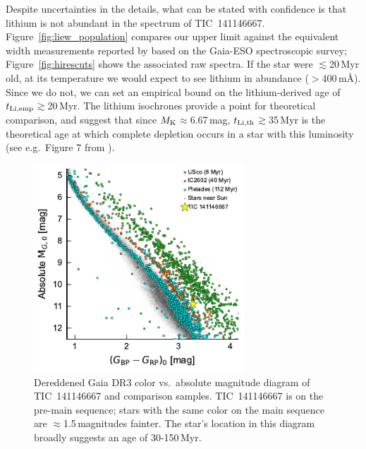 \documentclass{nature3}
\begin{document}
\begin{methods}
Despite uncertainties in the details, what can be stated with confidence
is that lithium is not abundant in the spectrum of TIC~141146667.
Figure~\ref{fig:liew_population} compares our upper limit against the
equivalent width measurements reported by \cite{Jeffries2023}
based on the Gaia-ESO spectroscopic survey; Figure~\ref{fig:hirescuts}
shows the associated raw spectra.  If the star were $\lesssim$20\,Myr
old, at its temperature we would expect to see lithium in abundance
($>$400\,m\AA).  Since we do not, we can set an empirical bound on the
lithium-derived age of $t_{\rm Li,emp}$$\gtrsim$20\,Myr.  The
\cite{Feiden2016} lithium isochrones provide a point for theoretical
comparison, and suggest that since $M_{\rm K}$$\approx$6.67\,mag,
$t_{\rm Li,th}$$\gtrsim$35\,Myr is the theoretical age at which
complete depletion occurs in a star with this luminosity (see
e.g.~Figure 7 from \cite{Wood2023}).



\begin{figure}[!t]
  \centering
  \includegraphics[width=0.7\textwidth]{figures/sf3.pdf}
  \caption{Dereddened Gaia DR3 color vs.~absolute magnitude diagram of
  TIC~141146667 and comparison samples. 
  TIC~141146667 is on the pre-main sequence; stars with the same color
  on the main sequence are $\approx$1.5\,magnitudes
  fainter.  The star's location in this diagram broadly suggests an
  age of 30-150\,Myr.  }
  \label{fig:camd}
\end{figure}



\end{methods}
\end{document}
